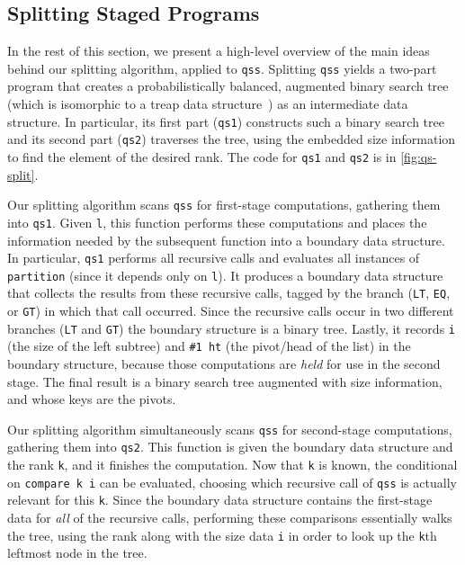 \begin{abstrsyn}
\subsection{Splitting Staged Programs}



In the rest of this section, we present a high-level overview of the main ideas
behind our splitting algorithm, applied to \texttt{qss}.
%
Splitting \texttt{qss} yields a two-part program that creates a
probabilistically balanced, augmented binary search tree (which is isomorphic to
a treap data structure~\cite{SeidelAr96}) as an intermediate data structure. In
particular, its first part (\texttt{qs1}) constructs such a binary search tree
and its second part (\texttt{qs2}) traverses the tree, using the embedded size
information to find the element of the desired rank.
%
The code for \texttt{qs1} and \texttt{qs2} is in \ref{fig:qs-split}.


Our splitting algorithm scans \texttt{qss} for first-stage computations,
gathering them into \texttt{qs1}. Given \texttt{l}, this function performs these
computations and places the information needed by the subsequent function into a
boundary data structure.
%
In particular, \texttt{qs1} performs all recursive calls and evaluates all
instances of \texttt{partition} (since it depends only on \texttt{l}). It
produces a boundary data structure that collects the results from these
recursive calls, tagged by the branch (\texttt{LT}, \texttt{EQ}, or \texttt{GT})
in which that call occurred. Since the recursive calls occur in two different
branches (\texttt{LT} and \texttt{GT}) the boundary structure is a binary tree.  
%
Lastly, it records \texttt{i} (the size of the left subtree) and \texttt{\#1 ht}
(the pivot/head of the list) in the boundary structure, because those
computations are \emph{held} for use in the second stage.
%
The final result is a binary search tree augmented with size information, and
whose keys are the pivots.

Our splitting algorithm simultaneously scans \texttt{qss} for second-stage
computations, gathering them into \texttt{qs2}. This function is given the boundary
data structure and the rank \texttt{k}, and it finishes the computation. Now that
\texttt{k} is known, the conditional on \texttt{compare k i} can be evaluated,
choosing which recursive call of \texttt{qss} is actually relevant for this
\texttt{k}. Since the boundary data structure contains the first-stage data for
\emph{all} of the recursive calls, performing these comparisons essentially
walks the tree, using the rank along with the size data \texttt{i} in order to
look up the \texttt{k}th leftmost node in the tree.


\end{abstrsyn}
